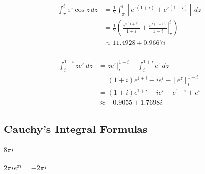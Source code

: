 \documentclass{article}
\begin{document}
\setcounter{subsubsection}{20}
\subsubsection{}

\begin{align*}
  \int_\pi^i e^z \cos z \,d z & = \frac{1}{2} \int_\pi^i [e^{z (1 + i)} + e^{z (1 - i)}] \,d z                                              \\
                              & = \frac{1}{2} \left( \left. \frac{e^{z (1 + i)}}{1 + i} + \frac{e^{z (1 - i)}}{1 - i} \right|_\pi^i \right) \\
                              & \approx 11.4928 + 0.9667 i
\end{align*}

\setcounter{subsubsection}{22}
\subsubsection{}

\begin{align*}
  \int_i^{1 + i} z e^z \,d z & = z e^z|_i^{1 + i} - \int_i^{1 + i} e^z \,d z \\
                             & = (1 + i) e^{1 + i} - i e^i - [e^z]_i^{1 + i} \\
                             & = (1 + i) e^{1 + i} - i e^i - e^{1 + i} + e^i \\
                             & \approx -0.9055 + 1.7698 i
\end{align*}

\subsection{Cauchy's Integral Formulas}

\subsubsection{}

$8 \pi i$

\setcounter{subsubsection}{2}
\subsubsection{}

$2 \pi i e^{\pi i} = -2 \pi i$

\setcounter{subsubsection}{4}
\subsubsection{}
\end{document}
